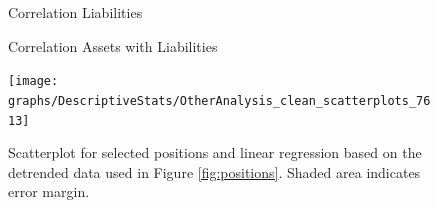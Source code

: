 \documentclass[12pt, a4paper]{article} %
\begin{document}
\begin{figure}[H]
\begin{minipage}{\textwidth}
\scriptsize
\hskip-2.0cm

\caption[1]{Correlation Liabilities}
\label{fig:corr_liab}
\end{minipage}
\end{figure}


\begin{figure}[H]
\begin{minipage}{\textwidth}
\scriptsize
\hskip-2.0cm

\caption[1]{Correlation Assets with Liabilities}
\label{fig:corr_comb}
\end{minipage}
\end{figure}

\begin{figure}[H]
\begin{minipage}{\textwidth}
\centering
\texttt{[image: graphs/DescriptiveStats/OtherAnalysis\_clean\_scatterplots\_7613]}
\caption[1]{Scatterplot for selected positions and linear regression based on the detrended data used in Figure \ref{fig:positions}. Shaded area indicates error margin.}
\label{fig:scatterplots}
\end{minipage}
\end{figure}
\end{document}
